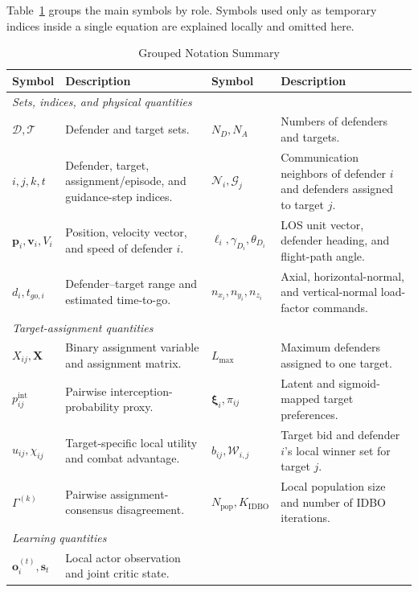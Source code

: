 \documentclass[lettersize,journal]{IEEEtran}
\begin{document}
Table~\ref{tab:notation} groups the main symbols by role. Symbols used only as temporary
indices inside a single equation are explained locally and omitted here.

\begin{table}[!t]
\color{blue}
\centering
\caption{Grouped Notation Summary}
\label{tab:notation}
\renewcommand{\arraystretch}{1.12}
\footnotesize
\begin{tabular}{@{}p{}p{}p{}p{}@{}}
\toprule
Symbol & Description & Symbol & Description \\
\midrule
\multicolumn{4}{l}{\emph{Sets, indices, and physical quantities}}\\
$\mathcal D,\mathcal T$ & Defender and target sets. &
$N_D,N_A$ & Numbers of defenders and targets.\\
$i,j,k,t$ & Defender, target, assignment/episode, and guidance-step indices. &
$\mathcal N_i,\mathcal G_j$ & Communication neighbors of defender $i$ and defenders assigned to target $j$.\\
$\mathbf p_i,\mathbf v_i,V_i$ & Position, velocity vector, and speed of defender $i$. &
$\boldsymbol\ell_i,\gamma_{D_i},\theta_{D_i}$ & LOS unit vector, defender heading, and flight-path angle.\\
$d_i,t_{go,i}$ & Defender--target range and estimated time-to-go. &
$n_{x_i},n_{y_i},n_{z_i}$ & Axial, horizontal-normal, and vertical-normal load-factor commands.\\
\midrule
\multicolumn{4}{l}{\emph{Target-assignment quantities}}\\
$X_{ij},\mathbf X$ & Binary assignment variable and assignment matrix. &
$L_{\max}$ & Maximum defenders assigned to one target.\\
$p_{ij}^{\mathrm{int}}$ & Pairwise interception-probability proxy. &
$\boldsymbol\xi_i,\pi_{ij}$ & Latent and sigmoid-mapped target preferences.\\
$u_{ij},\chi_{ij}$ & Target-specific local utility and combat advantage. &
$b_{ij},\mathcal W_{i,j}$ & Target bid and defender $i$'s local winner set for target $j$.\\
$\Gamma^{(k)}$ & Pairwise assignment-consensus disagreement. &
$N_{\mathrm{pop}},K_{\mathrm{IDBO}}$ & Local population size and number of IDBO iterations.\\
\midrule
\multicolumn{4}{l}{\emph{Learning quantities}}\\
$\mathbf o_i^{(t)},\mathbf s_t$ & Local actor observation and joint critic state. &

\end{tabular}
\end{table}
\end{document}
